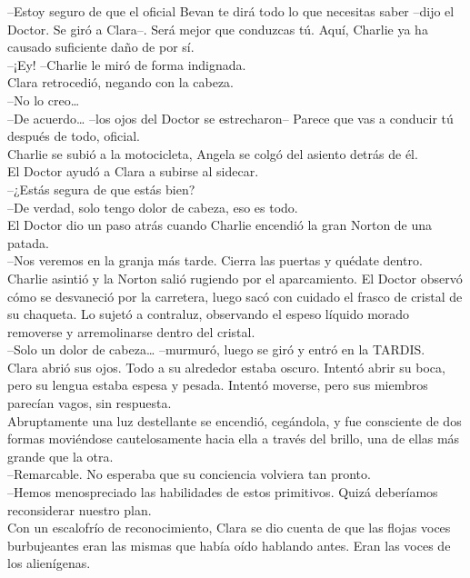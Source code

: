 --Estoy seguro de que el oficial Bevan te dirá todo lo que necesitas
saber --dijo el Doctor. Se giró a Clara--. Será mejor que conduzcas tú.
Aquí, Charlie ya ha causado suficiente daño de por sí.\\
--¡Ey! --Charlie le miró de forma indignada.\\
Clara retrocedió, negando con la cabeza.\\
--No lo creo\ldots{}\\
--De acuerdo\ldots{} --los ojos del Doctor se estrecharon-- Parece que
vas a conducir tú después de todo, oficial.\\
Charlie se subió a la motocicleta, Angela se colgó del asiento detrás de
él.\\
El Doctor ayudó a Clara a subirse al sidecar.\\
--¿Estás segura de que estás bien?\\
--De verdad, solo tengo dolor de cabeza, eso es todo.\\
El Doctor dio un paso atrás cuando Charlie encendió la gran Norton de
una patada.\\
--Nos veremos en la granja más tarde. Cierra las puertas y quédate
dentro.\\
Charlie asintió y la Norton salió rugiendo por el aparcamiento. El
Doctor observó cómo se desvaneció por la carretera, luego sacó con
cuidado el frasco de cristal de su chaqueta. Lo sujetó a contraluz,
observando el espeso líquido morado removerse y arremolinarse dentro del
cristal.\\
--Solo un dolor de cabeza\ldots{} --murmuró, luego se giró y entró en la
TARDIS.\\[2\baselineskip]Clara abrió sus ojos. Todo a su alrededor
estaba oscuro. Intentó abrir su boca, pero su lengua estaba espesa y
pesada. Intentó moverse, pero sus miembros parecían vagos, sin
respuesta.\\
Abruptamente una luz destellante se encendió, cegándola, y fue
consciente de dos formas moviéndose cautelosamente hacia ella a través
del brillo, una de ellas más grande que la otra.\\
--Remarcable. No esperaba que su conciencia volviera tan pronto.\\
--Hemos menospreciado las habilidades de estos primitivos. Quizá
deberíamos reconsiderar nuestro plan.\\
Con un escalofrío de reconocimiento, Clara se dio cuenta de que las
flojas voces burbujeantes eran las mismas que había oído hablando antes.
Eran las voces de los alienígenas.\\
